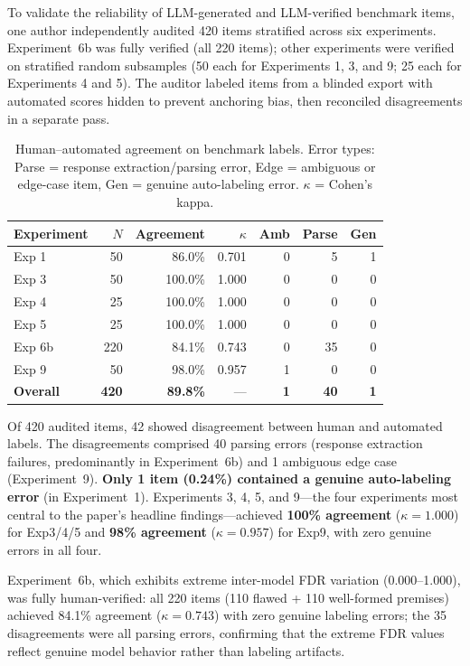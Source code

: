 \documentclass[10pt]{article}
\begin{document}
To validate the reliability of LLM-generated and LLM-verified benchmark items,
one author independently audited 420 items stratified across six experiments.
Experiment~6b was fully verified (all 220 items); other experiments were verified
on stratified random subsamples (50 each for Experiments 1, 3, and 9; 25 each for
Experiments 4 and 5). The auditor labeled items from a blinded export with
automated scores hidden to prevent anchoring bias, then reconciled disagreements
in a separate pass.

\begin{table}[h]
\centering
\caption{Human--automated agreement on benchmark labels. Error types:
  Parse = response extraction/parsing error, Edge = ambiguous or edge-case item,
  Gen = genuine auto-labeling error. $\kappa$ = Cohen's kappa.}
\label{tab:human-audit}
\small
\begin{tabular}{lrrrrrr}
\toprule
Experiment & $N$ & Agreement & $\kappa$ & Amb & Parse & Gen \\
\midrule
Exp 1 & 50 & 86.0\% & 0.701 & 0 & 5 & 1 \\
Exp 3 & 50 & 100.0\% & 1.000 & 0 & 0 & 0 \\
Exp 4 & 25 & 100.0\% & 1.000 & 0 & 0 & 0 \\
Exp 5 & 25 & 100.0\% & 1.000 & 0 & 0 & 0 \\
Exp 6b & 220 & 84.1\% & 0.743 & 0 & 35 & 0 \\
Exp 9 & 50 & 98.0\% & 0.957 & 1 & 0 & 0 \\
\midrule
\textbf{Overall} & \textbf{420} & \textbf{89.8\%} & --- & \textbf{1} & \textbf{40} & \textbf{1} \\
\bottomrule
\end{tabular}
\end{table}

Of 420 audited items, 42 showed disagreement between human and automated labels.
The disagreements comprised 40 parsing errors (response extraction failures, predominantly in Experiment~6b) and 1 ambiguous edge case (Experiment~9). \textbf{Only 1 item (0.24\%) contained a genuine auto-labeling error} (in Experiment~1).
Experiments 3, 4, 5, and 9---the four experiments most central to the paper's headline findings---achieved \textbf{100\% agreement} ($\kappa = 1.000$) for Exp3/4/5 and \textbf{98\% agreement} ($\kappa = 0.957$) for Exp9, with zero genuine errors in all four.

Experiment~6b, which exhibits extreme inter-model FDR variation (0.000--1.000),
was fully human-verified: all 220 items (110 flawed + 110 well-formed premises)
achieved 84.1\% agreement ($\kappa = 0.743$) with zero genuine labeling errors; the 35 disagreements
were all parsing errors, confirming that the extreme FDR values
reflect genuine model behavior rather than labeling artifacts.
\end{document}
